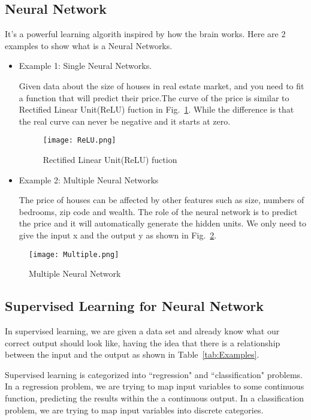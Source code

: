 \documentclass[a4paper]{article}
\begin{document}
\subsection{Neural Network}
It's a powerful learning algorith inspired by how the brain works. Here are 2 examples to show what is a Neural Networks.
\begin{itemize}
\item Example 1: Single Neural Networks.\par 
Given data about the size of houses in real estate market, and you need to fit a function that will predict their price.The curve of the price is similar to Rectified Linear Unit(ReLU) fuction in Fig.~\ref{fig:ReLU}. While the difference is that the real curve can never be negative and it starts at zero.

\begin{figure}[!htp]
\begin{center}
   \texttt{[image: ReLU.png]}
\end{center}
   \caption{Rectified Linear Unit(ReLU) fuction}
\label{fig:ReLU}
\end{figure}

\item Example 2: Multiple Neural Networks\par
The price of houses can be affected by other features such as size, numbers of bedrooms, zip code and wealth. The role of the neural network is to predict the price and it will automatically generate the hidden units. We only need to give the input x and the output y as shown in Fig.~\ref{fig:Multiple}.
\end{itemize}

\begin{figure}[!htp]
\begin{center}
   \texttt{[image: Multiple.png]}
\end{center}
   \caption{Multiple Neural Network~\cite{Coursera.org}}
\label{fig:Multiple}
\end{figure}


\subsection{Supervised Learning for Neural Network}
In supervised learning, we are given a data set and already know what our correct output should look like, having the idea that there is a relationship between the input and the output as shown in Table~\ref{tab:Examples}.\par
Supervised learning is categorized into ``regression" and ``classification" problems. In a regression problem, we are trying to map input variables to some continuous function, predicting the results within the a continuous output. In a classification problem, we are trying to map input variables into discrete categories.\par
\end{document}

